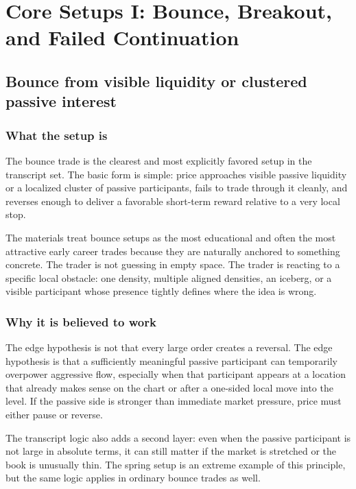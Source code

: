 \section{Core Setups I: Bounce, Breakout, and Failed Continuation}

\subsection{Bounce from visible liquidity or clustered passive interest}

\subsubsection{What the setup is}

The bounce trade is the clearest and most explicitly favored setup in the transcript set. The
basic form is simple: price approaches visible passive liquidity or a localized cluster of
passive participants, fails to trade through it cleanly, and reverses enough to deliver a
favorable short-term reward relative to a very local stop.

The materials treat bounce setups as the most educational and often the most attractive early
career trades because they are naturally anchored to something concrete. The trader is not
guessing in empty space. The trader is reacting to a specific local obstacle: one density,
multiple aligned densities, an iceberg, or a visible participant whose presence tightly defines
where the idea is wrong.

\subsubsection{Why it is believed to work}

The edge hypothesis is not that every large order creates a reversal. The edge hypothesis is
that a sufficiently meaningful passive participant can temporarily overpower aggressive flow,
especially when that participant appears at a location that already makes sense on the chart or
after a one-sided local move into the level. If the passive side is stronger than immediate
market pressure, price must either pause or reverse.

The transcript logic also adds a second layer: even when the passive participant is not large
in absolute terms, it can still matter if the market is stretched or the book is unusually
thin. The spring setup is an extreme example of this principle, but the same logic applies in
ordinary bounce trades as well.

